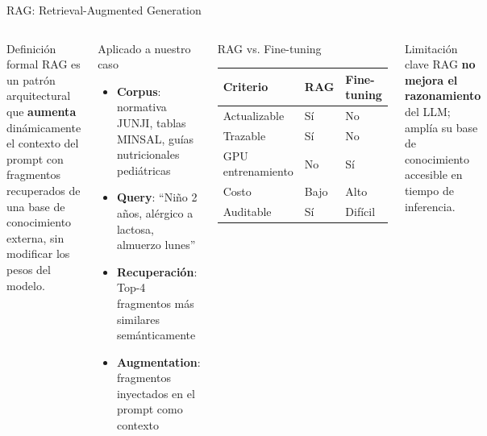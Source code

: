 \documentclass[aspectratio=169]{beamer}
\begin{document}
\begin{frame}{RAG: Retrieval-Augmented Generation}
  \begin{columns}
    \begin{block}{Definición formal}
      RAG es un patrón arquitectural que \textbf{aumenta} dinámicamente
      el contexto del prompt con fragmentos recuperados de una base de
      conocimiento externa, sin modificar los pesos del modelo.
    \end{block}
    \vspace{0.4em}
    \begin{block}{Aplicado a nuestro caso}
      \begin{itemize}
        \item \textbf{Corpus}: normativa JUNJI, tablas MINSAL, guías nutricionales pediátricas
        \item \textbf{Query}: ``Niño 2 años, alérgico a lactosa, almuerzo lunes''
        \item \textbf{Recuperación}: Top-4 fragmentos más similares semánticamente
        \item \textbf{Augmentation}: fragmentos inyectados en el prompt como contexto
      \end{itemize}
    \end{block}
    \begin{exampleblock}{RAG vs. Fine-tuning}
      \begin{tabular}{lll}
        \toprule
        \textbf{Criterio} & \textbf{RAG} & \textbf{Fine-tuning} \\
        \midrule
        Actualizable & Sí & No \\
        Trazable & Sí & No \\
        GPU entrenamiento & No & Sí \\
        Costo & Bajo & Alto \\
        Auditable & Sí & Difícil \\
        \bottomrule
      \end{tabular}
    \end{exampleblock}
    \vspace{0.4em}
    \begin{alertblock}{Limitación clave}
      RAG \textbf{no mejora el razonamiento} del LLM; amplía su
      base de conocimiento accesible en tiempo de inferencia.
    \end{alertblock}
  \end{columns}
\end{frame}
\end{document}
